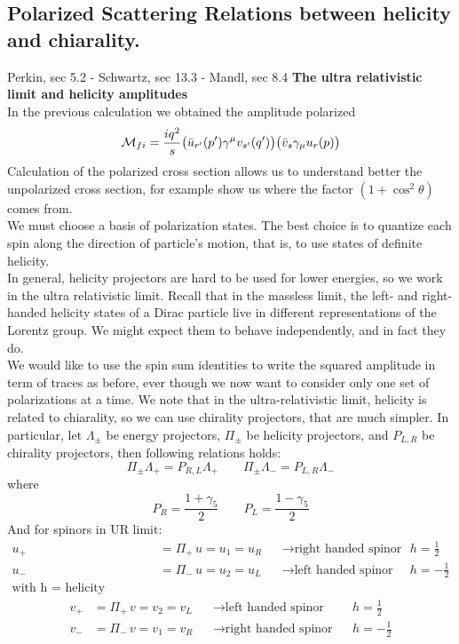\documentclass[TheoreticalPhy_ModB.tex]{subfiles}
\begin{document}
\subsection{Polarized Scattering Relations between helicity and chiarality.}
\textsf{Perkin, sec 5.2 - Schwartz, sec 13.3 - Mandl, sec 8.4}
\textbf{The ultra relativistic limit and helicity amplitudes}\\
In the previous calculation we obtained the amplitude polarized
\[
\mathcal{M}_{fi} = \frac{iq^2}{s} \bigl( \bar{u}_{r'} (p') \gamma^{\mu} v_{s'} (q') \bigr) \bigl( \bar{v}_s \gamma_{\mu} u_r(p) \bigr)
\]
Calculation of the polarized cross section allows us to understand better the unpolarized cross section, for example show us where the factor $(1 + \cos^2 \theta)$ comes from.\\
We must choose a basis of polarization states. The best choice is to quantize each spin along the direction of particle's motion, that is, to use states of definite helicity.\\
In general, helicity projectors are hard to be used for lower energies, so we work in the ultra relativistic limit. Recall that in the massless limit, the left- and right-handed helicity states of a Dirac particle live in different representations of the Lorentz group. We might expect them to behave independently, and in fact they do.\\
We would like to use the spin sum identities to write the squared amplitude in term of traces as before, ever though we now want to consider only one set of polarizations at a time. We note that in the ultra-relativistic limit, helicity is related to chiarality, so we can use chirality projectors, that are much simpler. In particular, let $\Lambda_{\pm}$ be energy projectors, $\Pi_{\pm}$ be helicity projectors, and $P_{L, R}$ be chirality projectors, then following relations holds:
\[
\Pi_{\pm}\Lambda_+ = P_{R, L}\Lambda_+
\qquad
\Pi_{\pm}\Lambda_- = P_{L, R}\Lambda_-
\]
where
\[
P_R = \frac{1 + \gamma_5}{2}
\qquad
P_L = \frac{1 - \gamma_5}{2}
\]
And for spinors in UR limit:
\begin{align*}
u_+ 	& = \Pi_+ \, u = u_1 = u_R & &\to \text{right handed spinor}	& & h = \frac{1}{2} \\
u_- 	& = \Pi_- \, u = u_2 = u_L 	& &\to \text{left handed spinor}		& & h = -\frac{1}{2} \\
\text{with h = helicity eigenvalue}
\end{align*}
\begin{align*}
v_+ 	& = \Pi_+ \, v = v_2 = v_L 	& &\to \text{left handed spinor}		& & h = \frac{1}{2} \\
v_- 	& = \Pi_- \, v = v_1 = v_R	& &\to \text{right handed spinor}		& & h = -\frac{1}{2} \\
\end{align*}
\end{document}
